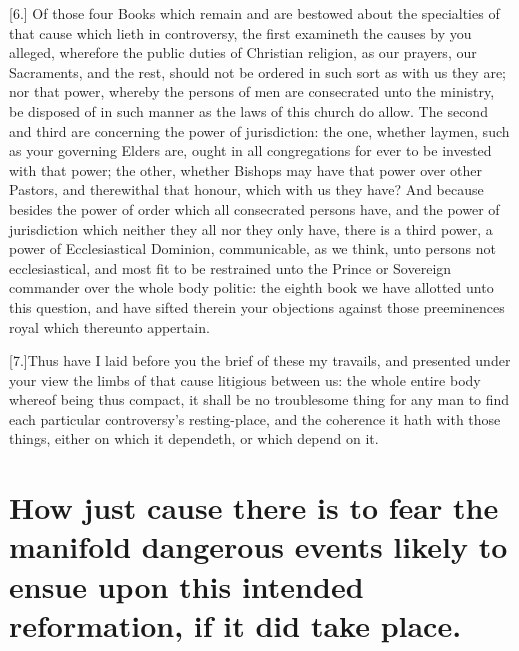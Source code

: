 [6.] Of those four Books which remain and are bestowed about the specialties of that cause which lieth in controversy, the first examineth the causes by you alleged, wherefore the public duties of Christian religion, as our prayers, our Sacraments, and the rest, should not be ordered in such sort as with us they are; nor that power, whereby the persons of men are consecrated unto the ministry, be disposed of in such manner as the laws of this church do allow. The second and third are concerning the power of jurisdiction: the one, whether laymen, such as your governing Elders are, ought in all congregations for ever to be invested with that power; the other, whether Bishops may have that power over other Pastors, and therewithal that honour, which with us they have? And because besides the power of order which all consecrated persons have, and the power of jurisdiction which neither they all nor they only have, there is a third power, a power of Ecclesiastical Dominion, communicable, as we think, unto persons not ecclesiastical, and most fit to be restrained unto the Prince or Sovereign commander over the whole body politic: the eighth book we have allotted unto this question, and have sifted therein your objections against those preeminences royal which thereunto appertain.

[7.]Thus have I laid before you the brief of these my travails, and presented under your view the limbs of that cause litigious between us: the whole entire body whereof being thus compact, it shall be no troublesome thing for any man to find each particular controversy’s resting-place, and the coherence it hath with those things, either on which it dependeth, or which depend on it.

\section*{How just cause there is to fear the manifold dangerous events likely to ensue upon this intended reformation, if it did take place.}

